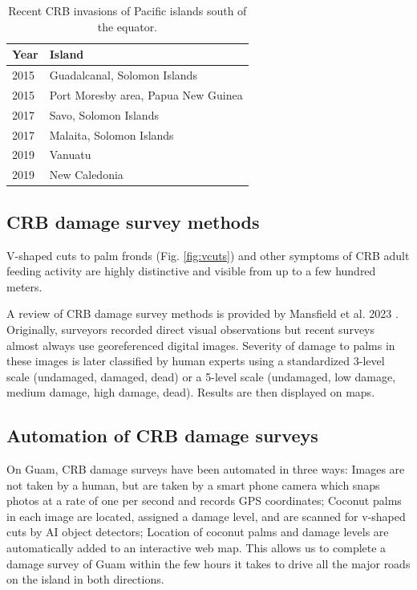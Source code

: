 \documentclass[11pt,english,letterpaper]{scrartcl}
\begin{document}
\begin{table}[H]
	\centering
	\caption{Recent CRB invasions of Pacific islands south of the equator.}	
	
	\begin{tabular}{ll}
		\toprule
		\textbf{Year} & \textbf{Island} \\ \midrule
		2015 & Guadalcanal, Solomon Islands \\
		2015 & Port Moresby area, Papua New Guinea \\
		2017 & Savo, Solomon Islands \\
		2017 & Malaita, Solomon Islands \\
		2019 & Vanuatu \\
		2019 & New Caledonia \\
	\end{tabular}
	\label{tbl:south}	
\end{table}

\subsection{CRB damage survey methods}

V-shaped cuts to palm fronds (Fig. \ref{fig:vcuts}) and other symptoms of CRB adult feeding activity are highly distinctive and visible from up to a few hundred meters.

A review of CRB damage survey methods is provided by Mansfield et al. 2023 \cite{Mansfield2023}. Originally, surveyors recorded direct visual observations but recent surveys almost always use georeferenced digital images. Severity of damage to palms in these images is later classified by human experts using a standardized 3-level scale (undamaged, damaged, dead) or a 5-level scale (undamaged, low damage, medium damage, high damage, dead). Results are then displayed on maps. 

\subsection{Automation of CRB damage surveys}

On Guam, CRB damage surveys have been automated in three ways:
Images are not taken by a human, but are taken by a smart phone camera which snaps photos at a rate of one per second and records GPS coordinates;
Coconut palms in each image are located, assigned a damage level, and are scanned for v-shaped cuts by AI object detectors;
Location of coconut palms and damage levels are automatically added to an interactive web map.
This allows us to complete a damage survey of Guam within the few hours it takes to drive all the major roads on the island in both directions.
\end{document}
